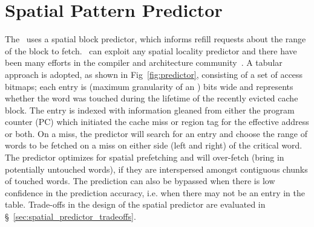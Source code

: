 \section{Spatial Pattern Predictor}
\label{sec:spatial_pattern_predictor}

The \AC\ uses a spatial block predictor, which  informs refill requests about the range of the block to fetch. \AC\ can exploit any spatial locality predictor and there have been many efforts in the compiler and architecture community~\cite{Chilimbi-Hill-pldi-1999, kumar-isca-1998, pujara-hpca-2006,chen-hpca-2004}. A tabular approach is adopted, as shown in Fig~\ref{fig:predictor}, consisting of a set of access bitmaps; each entry is  (maximum granularity of an \AB{}) bits wide and represents whether the word was touched during the lifetime of the recently evicted cache block. The entry is indexed with information gleaned from either the program counter (PC) which initiated the cache miss or region tag for the effective address or both. On a miss, the predictor will search for an entry  and choose the range of words to be fetched on a miss on either side (left and right) of the critical word. The predictor optimizes for spatial prefetching and will  over-fetch (bring in potentially untouched words), if they are interspersed amongst contiguous chunks of touched words. The prediction can also be bypassed when there is low confidence in the prediction accuracy, i.e. when there may not be an entry in the table. Trade-offs in the design of the spatial predictor are evaluated in \S~\ref{sec:spatial_predictor_tradeoffs}.


